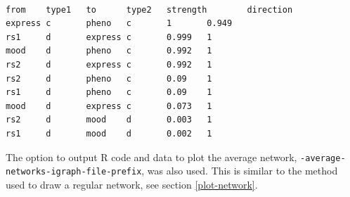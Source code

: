 \documentclass[a4paper,12pt]{article}
\newcommand{\code}[1]{{\footnotesize{{\tt #1}}}}
\begin{document}
\vspace{0.35cm} \begin{lstlisting}

from    type1   to      type2   strength        direction
express c       pheno   c       1       0.949
rs1     d       express c       0.999   1
mood    d       pheno   c       0.992   1
rs2     d       express c       0.992   1
rs2     d       pheno   c       0.09    1
rs1     d       pheno   c       0.09    1
mood    d       express c       0.073   1
rs2     d       mood    d       0.003   1
rs1     d       mood    d       0.002   1

\end{lstlisting} \vspace{0.35cm}
The option to output R code and data to plot the average network, \code{-average-networks-igraph-file-prefix}, was also used. This is similar to the method used to draw a regular network, see  section \ref{plot-network}. 
\end{document}
